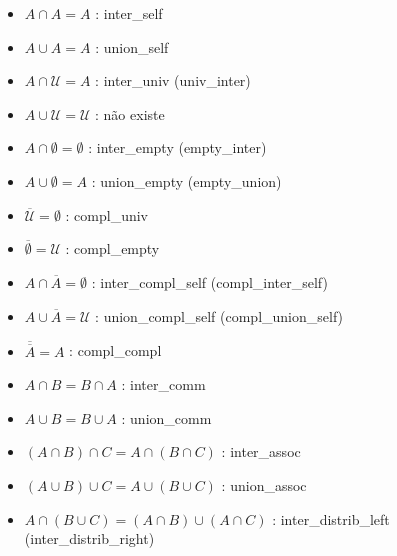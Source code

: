 \begin{itemize}
\item $A \cap A = A$ : {\selectfont inter\_self}
\item $A \cup A = A$ : {\selectfont union\_self}
\item $A \cap \mathcal U = A$ : {\selectfont inter\_univ} ({\selectfont univ\_inter})
\item $A \cup \mathcal U = \mathcal U$ : não existe
\item $A \cap \emptyset = \emptyset$ : {\selectfont inter\_empty} ({\selectfont empty\_inter})
\item $A \cup \emptyset = A$ : {\selectfont union\_empty} ({\selectfont empty\_union})
\item $\overline {\mathcal U} = \emptyset$ : {\selectfont compl\_univ}
\item $\overline {\emptyset} = \mathcal U$ : {\selectfont compl\_empty}
\item $A \cap \overline A = \emptyset$ : {\selectfont inter\_compl\_self} ({\selectfont compl\_inter\_self})
\item $A \cup \overline A = \mathcal U$ : {\selectfont union\_compl\_self} ({\selectfont compl\_union\_self})
\item $\overline{\overline A} = A$ : {\selectfont compl\_compl}
\item $A \cap B = B \cap A$ : {\selectfont inter\_comm}
\item $A \cup B = B \cup A$ : {\selectfont union\_comm}
\item $(A \cap B) \cap C = A \cap (B \cap C)$ : {\selectfont inter\_assoc}
\item $(A \cup B) \cup C = A \cup (B \cup C)$ : {\selectfont union\_assoc}
\item $A \cap (B \cup C) = (A \cap B) \cup (A \cap C)$ : {\selectfont inter\_distrib\_left} ({\selectfont inter\_distrib\_right})

\end{itemize}
